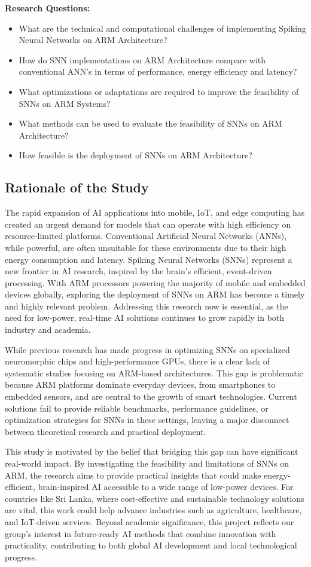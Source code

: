 \documentclass[a4paper,12pt]{article}
\begin{document}
	\textbf{Research Questions:}
	\begin{itemize}
		\item What are the technical and computational challenges of implementing Spiking Neural Networks on ARM Architecture?
		\item How do SNN implementations on ARM Architecture compare with conventional ANN's in terms of performance, energy efficiency and latency?
		\item What optimizations or adaptations are required to improve the feasibility of SNNs on ARM Systems?
		\item What methods can be used to evaluate the feasibility of SNNs on ARM Architecture?
		\item How feasible is the deployment of SNNs on ARM Architecture?
	\end{itemize}
	
	\subsection{Rationale of the Study}
	The rapid expansion of AI applications into mobile, IoT, and edge computing has created an urgent demand for models that can operate with high efficiency on resource-limited platforms. Conventional Artificial Neural Networks (ANNs), while powerful, are often unsuitable for these environments due to their high energy consumption and latency. Spiking Neural Networks (SNNs) represent a new frontier in AI research, inspired by the brain’s efficient, event-driven processing. With ARM processors powering the majority of mobile and embedded devices globally, exploring the deployment of SNNs on ARM has become a timely and highly relevant problem. Addressing this research now is essential, as the need for low-power, real-time AI solutions continues to grow rapidly in both industry and academia.
	
	While previous research has made progress in optimizing SNNs on specialized neuromorphic chips and high-performance GPUs, there is a clear lack of systematic studies focusing on ARM-based architectures. This gap is problematic because ARM platforms dominate everyday devices, from smartphones to embedded sensors, and are central to the growth of smart technologies. Current solutions fail to provide reliable benchmarks, performance guidelines, or optimization strategies for SNNs in these settings, leaving a major disconnect between theoretical research and practical deployment.
	
	This study is motivated by the belief that bridging this gap can have significant real-world impact. By investigating the feasibility and limitations of SNNs on ARM, the research aims to provide practical insights that could make energy-efficient, brain-inspired AI accessible to a wide range of low-power devices. For countries like Sri Lanka, where cost-effective and sustainable technology solutions are vital, this work could help advance industries such as agriculture, healthcare, and IoT-driven services. Beyond academic significance, this project reflects our group’s interest in future-ready AI methods that combine innovation with practicality, contributing to both global AI development and local technological progress.
	
\end{document}
